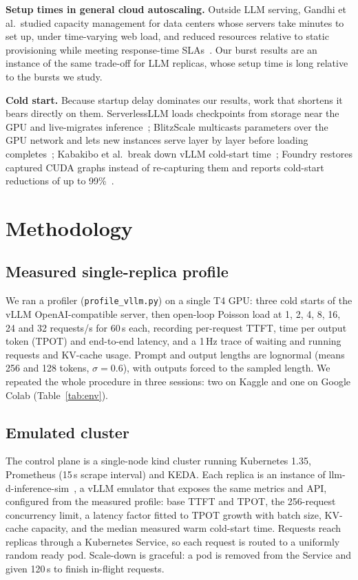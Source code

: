 \documentclass[10pt,conference]{IEEEtran}
\begin{document}
\textbf{Setup times in general cloud autoscaling.} Outside LLM serving,
Gandhi et al.\ studied capacity management for data centers whose servers
take minutes to set up, under time-varying web load, and reduced resources
relative to static provisioning while meeting response-time
SLAs~\cite{gandhi2012autoscale}. Our burst results are an instance of the
same trade-off for LLM replicas, whose setup time is long relative to the
bursts we study.

\textbf{Cold start.} Because startup delay dominates our results, work that
shortens it bears directly on them. ServerlessLLM loads checkpoints from
storage near the GPU and live-migrates inference~\cite{fu2024serverlessllm};
BlitzScale multicasts parameters over the GPU network and lets new instances
serve layer by layer before loading completes~\cite{zhang2025blitzscale};
Kabakibo et al.\ break down vLLM cold-start time~\cite{kabakibo2026breaking};
Foundry restores captured CUDA graphs instead of re-capturing them and reports
cold-start reductions of up to 99\%~\cite{liu2026foundry}.

\section{Methodology}
\label{sec:method}
\subsection{Measured single-replica profile}
We ran a profiler (\texttt{profile\_vllm.py}) on a single T4 GPU: three cold
starts of the vLLM OpenAI-compatible server, then open-loop Poisson load at
1, 2, 4, 8, 16, 24 and 32 requests/s for 60\,s each, recording per-request
TTFT, time per output token (TPOT) and end-to-end latency, and a 1\,Hz trace
of waiting and running requests and KV-cache usage. Prompt and output lengths
are lognormal (means 256 and 128 tokens, $\sigma=0.6$), with outputs forced to
the sampled length. We repeated the whole procedure in three sessions: two on
Kaggle and one on Google Colab (Table~\ref{tab:env}).

\subsection{Emulated cluster}
The control plane is a single-node kind cluster running Kubernetes 1.35,
Prometheus (15\,s scrape interval) and KEDA. Each replica is an instance of
llm-d-inference-sim~\cite{llmdsim}, a vLLM emulator that exposes the same
metrics and API, configured from the measured profile: base TTFT and TPOT,
the 256-request concurrency limit, a latency factor fitted to TPOT growth with
batch size, KV-cache capacity, and the median measured warm cold-start time.
Requests reach replicas through a Kubernetes Service, so each request is
routed to a uniformly random ready pod. Scale-down is graceful: a pod is
removed from the Service and given 120\,s to finish in-flight requests.
\end{document}
